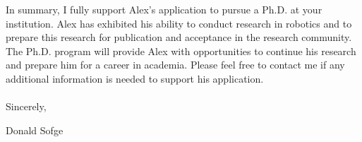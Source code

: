 \documentclass{article}
\begin{document}
In summary, I fully support Alex's application to pursue a Ph.D. at your
institution. Alex has exhibited his ability to conduct research in robotics and
to prepare this research for publication and acceptance in the research
community. The Ph.D. program will provide Alex with opportunities to continue
his research and prepare him for a career in academia. Please feel free to
contact me if any additional information is needed to support his application.
\\ \\Sincerely,

Donald Sofge
\end{document}
